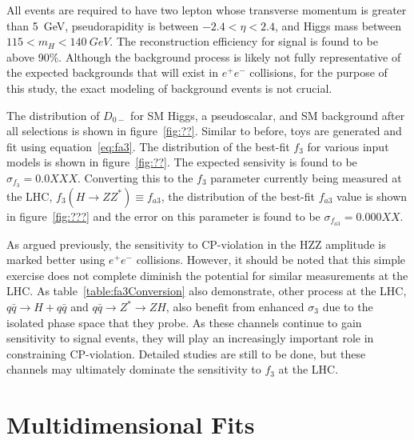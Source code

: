 All events are required to have two lepton whose 
transverse momentum is greater than 5~GeV,
pseudorapidity is between $-2.4<\eta<2.4$, and 
Higgs mass between $115<m_H<140~GeV$.  The reconstruction
efficiency for signal is found to be above 90\%. Although
the background process is likely not fully representative
of the expected backgrounds that will exist in $e^+e^-$
collisions, for the purpose of this study, the exact modeling 
of background events is not crucial.  

The distribution of $D_{0-}$ for SM Higgs, a pseudoscalar,
and SM background after all selections is shown in 
figure~\ref{fig:??}.  Similar to before, toys are generated
and fit using equation~\ref{eq:fa3}.  The distribution of
the best-fit $f_3$ for various input models is shown in 
figure~\ref{fig:??}.  The expected sensivity is found to be 
$\sigma_{f_3}=0.0XXX$.  Converting this to the $f_3$ parameter
currently being measured at the LHC, $f_3(H\to ZZ^*)\equiv f_{a3}$, 
the distribution of the best-fit $f_{a3}$ value is shown in 
figure~\ref{fig:???} and the error on this parameter is found
to be $\sigma_{f_{a3}}=0.000XX$.

As argued previously, the sensitivity to CP-violation in the 
HZZ amplitude is marked better using $e^+e^-$ collisions.  
However, it should be noted that this simple exercise does not
complete diminish the potential for similar measurements at 
the LHC.  As table~\ref{table:fa3Conversion} also demonstrate,
other process at the LHC, $q\bar{q}\to H + q\bar{q}$ and
$q\bar{q}\to Z^* \to ZH$, also benefit from enhanced $\sigma_3$
due to the isolated phase space that they probe.  As these channels 
continue to gain sensitivity to signal events, they will play an
increasingly important role in constraining CP-violation.
Detailed studies are still to be done, but these channels may
ultimately dominate the sensitivity to $f_3$ at the LHC.  

\section{Multidimensional Fits}



